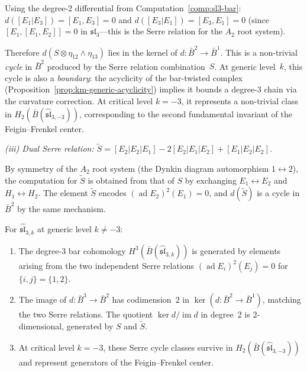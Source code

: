 \begin{computation}
Using the degree-2 differential from Computation~\ref{comp:sl3-bar}:
$d([E_1|E_3]) = [E_1, E_3] = 0$ and $d([E_3|E_1]) = [E_3, E_1] = 0$
(since $[E_1, [E_1, E_2]] = 0$ in $\mathfrak{sl}_3$---this is the
Serre relation for the $A_2$ root system).

Therefore $d(S \otimes \eta_{12}\wedge\eta_{13})$ lies in the kernel of
$d\colon \bar{B}^2 \to \bar{B}^1$.  This is a non-trivial \emph{cycle}
in $\bar{B}^2$ produced by the Serre relation combination~$S$.  At generic
level~$k$, this cycle is also a \emph{boundary}: the acyclicity
of the bar-twisted complex (Proposition~\ref{prop:km-generic-acyclicity})
implies it bounds a degree-3 chain via the curvature correction.  At
critical level $k = -3$, it represents a non-trivial class in
$H_2(\bar{B}(\widehat{\mathfrak{sl}}_{3,-3}))$, corresponding to the
second fundamental invariant of the Feigin--Frenkel center.

\emph{(iii) Dual Serre relation:
$\tilde{S} = [E_{2}|E_{2}|E_{1}] - 2[E_{2}|E_{1}|E_{2}]
+ [E_{1}|E_{2}|E_{2}]$.}

By symmetry of the $A_2$ root system (the Dynkin diagram automorphism
$1 \leftrightarrow 2$), the computation for $\tilde{S}$ is obtained from
that of $S$ by exchanging $E_1 \leftrightarrow E_2$ and
$H_1 \leftrightarrow H_2$.  The element $\tilde{S}$ encodes
$(\operatorname{ad} E_2)^2(E_1) = 0$, and $d(\tilde{S})$ is a cycle
in $\bar{B}^2$ by the same mechanism.
\end{computation}

\begin{proposition}
\label{prop:sl3-serre-cohomology}
For $\widehat{\mathfrak{sl}}_{3,k}$ at generic level $k \neq -3$:
\begin{enumerate}[label=\textup{(\roman*)}]
\item The degree-3 bar cohomology $H^3(\bar{B}(\widehat{\mathfrak{sl}}_{3,k}))$
is generated by elements arising from the two independent Serre relations
$(\operatorname{ad} E_i)^2(E_j) = 0$ for $\{i,j\} = \{1,2\}$.
\item The image of $d\colon \bar{B}^3 \to \bar{B}^2$ has codimension~$2$
in $\ker(d\colon \bar{B}^2 \to \bar{B}^1)$, matching the two Serre
relations.  The quotient $\ker d / \operatorname{im} d$ in degree~2 is
$2$-dimensional, generated by $S$ and $\tilde{S}$.
\item At critical level $k = -3$, these Serre cycle classes
survive in $H_2(\bar{B}(\widehat{\mathfrak{sl}}_{3,-3}))$ and
represent generators of the Feigin--Frenkel center.
\end{enumerate}
\end{proposition}

